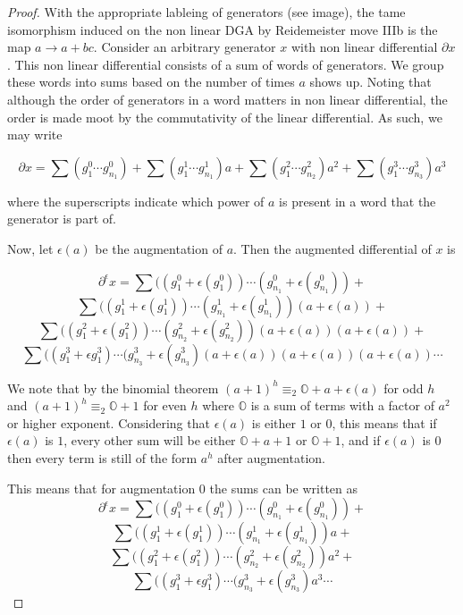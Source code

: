 \documentclass[11pt,oneside]{amsart}
\begin{document}
\begin{proof}

With the appropriate lableing of generators (see image), the tame isomorphism induced on the non linear DGA by Reidemeister move IIIb is the map $a \rightarrow a + bc$. Consider an arbitrary generator $x$ with non linear differential $\partial x$. This non linear differential consists of a sum of words of generators. We group these words into sums based on the number of times $a$ shows up. Noting that although the order of generators in a word matters in non linear differential, the order is made moot by the commutativity of the linear differential. As such, we may write

\[\partial x  = \sum (g_1^{0} \cdots g_{n_1}^{0}) + \sum (g_1^{1} \cdots g_{n_1}^{1})a + \sum (g_1^{2} \cdots g_{n_2}^{2})a^2 + \sum (g_1^{3} \cdots g_{n_3}^{3})a^3 \]

where the superscripts indicate which power of $a$ is present in a word that the generator is part of.

Now, let $\epsilon(a)$ be the augmentation of $a$. Then the augmented differential of $x$ is 

\[\partial^{\epsilon} x  = \sum ((g_1^{0} + \epsilon(g_1^{0})) \cdots (g_{n_1}^{0} + \epsilon(g_{n_1}^{0})) +    \]
\[\sum ((g_1^{1} + \epsilon(g_1^{1})) \cdots (g_{n_1}^{1} + \epsilon(g_{n_1}^{1}))(a + \epsilon(a)) +\]
\[\sum ((g_1^{2} + \epsilon(g_1^{2})) \cdots (g_{n_2}^{2} +\epsilon(g_{n_2}^{2}))(a + \epsilon(a))(a + \epsilon(a)) +\]
\[ \sum ((g_1^{3} + \epsilon g_1^{3}) \cdots (g_{n_3}^{3} + \epsilon(g_{n_3}^{3})(a + \epsilon(a))(a + \epsilon(a))(a + \epsilon(a)) \cdots\]



We note that by the binomial theorem $(a+1)^h \equiv_{2} \mathbb{O} + a + \epsilon(a)$ for odd $h$ and $(a+1)^h \equiv_{2} \mathbb{O}  + 1$ for even $h$ where $\mathbb{O}$ is a sum of terms with a factor of $a^2$ or higher exponent. Considering that $\epsilon(a)$ is either $1$ or $0$, this means that if $\epsilon(a)$ is $1$, every other sum will be either $\mathbb{O} + a + 1$ or $\mathbb{O} +  1$, and if $\epsilon(a)$ is $0$ then every term is still of the form $a^h$ after augmentation.

This means that for augmentation $0$ the sums can be written as
\[\partial^{\epsilon} x  = \sum ((g_1^{0} + \epsilon(g_1^{0})) \cdots (g_{n_1}^{0} + \epsilon(g_{n_1}^{0})) +    \]
\[\sum ((g_1^{1} + \epsilon(g_1^{1})) \cdots (g_{n_1}^{1} + \epsilon(g_{n_1}^{1}))a +\]
\[\sum ((g_1^{2} + \epsilon(g_1^{2})) \cdots (g_{n_2}^{2} +\epsilon(g_{n_2}^{2}))a^2 +\]
\[ \sum ((g_1^{3} + \epsilon g_1^{3}) \cdots (g_{n_3}^{3} + \epsilon(g_{n_3}^{3})a^3 \cdots\]


\end{proof}
\end{document}
